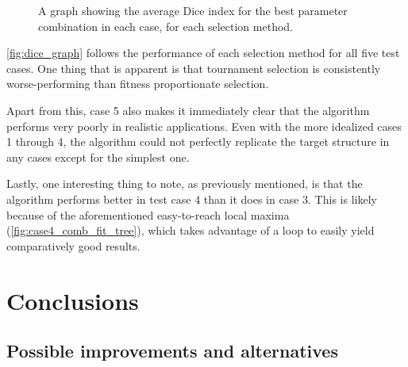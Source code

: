 \documentclass{report}
\begin{document}
\begin{figure}[H]
    \centering
    \caption{A graph showing the average Dice index for the best parameter combination in each case, for each selection method.}
    \label{fig:dice_graph}
\end{figure}

\autoref{fig:dice_graph} follows the performance of each selection method for all five test cases. One thing that is apparent is that tournament selection is consistently worse-performing than fitness proportionate selection.

Apart from this, case 5 also makes it immediately clear that the algorithm performs very poorly in realistic applications. Even with the more idealized cases 1 through 4, the algorithm could not perfectly replicate the target structure in any cases except for the simplest one.

Lastly, one interesting thing to note, as previously mentioned, is that the algorithm performs better in test case 4 than it does in case 3. This is likely because of the aforementioned easy-to-reach local maxima (\autoref{fig:case4_comb_fit_tree}), which takes advantage of a loop to easily yield comparatively good results.

\chapter{Conclusions}

\section{Possible improvements and alternatives}
\end{document}
